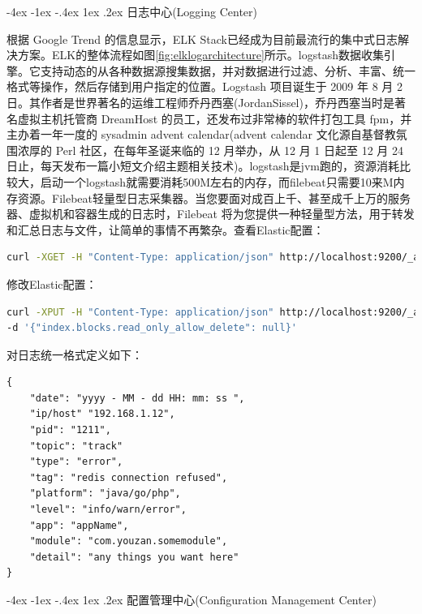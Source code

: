 \documentclass[8pt]{book}
\makeatletter
\numberwithin{dummy}{section}
\theoremstyle{ocrenumbox}
\theoremstyle{blacknumex}
\theoremstyle{blacknumbox}
\theoremstyle{ocrenum}
\renewcommand{\section}{\@startsection{section}{1}{\z@}
	{-4ex \@plus -1ex \@minus -.4ex}
	{1ex \@plus.2ex }
	{\normalfont\large\sffamily\bfseries}}
\makeatother
\begin{document}
\section{日志中心(Logging Center)}

根据 Google Trend 的信息显示，ELK Stack已经成为目前最流行的集中式日志解决方案。ELK的整体流程如图\ref{fig:elklogarchitecture}所示。logstash数据收集引擎。它支持动态的从各种数据源搜集数据，并对数据进行过滤、分析、丰富、统一格式等操作，然后存储到用户指定的位置。Logstash 项目诞生于 2009 年 8 月 2 日。其作者是世界著名的运维工程师乔丹西塞(JordanSissel)，乔丹西塞当时是著名虚拟主机托管商 DreamHost 的员工，还发布过非常棒的软件打包工具 fpm，并主办着一年一度的 sysadmin advent calendar(advent calendar 文化源自基督教氛围浓厚的 Perl 社区，在每年圣诞来临的 12 月举办，从 12 月 1 日起至 12 月 24 日止，每天发布一篇小短文介绍主题相关技术)。logstash是jvm跑的，资源消耗比较大，启动一个logstash就需要消耗500M左右的内存，而filebeat只需要10来M内存资源。Filebeat轻量型日志采集器。当您要面对成百上千、甚至成千上万的服务器、虚拟机和容器生成的日志时，Filebeat 将为您提供一种轻量型方法，用于转发和汇总日志与文件，让简单的事情不再繁杂。查看Elastic配置：

\begin{lstlisting}[language=Bash]
curl -XGET -H "Content-Type: application/json" http://localhost:9200/_all/_settings|jq '.'
\end{lstlisting}

修改Elastic配置：

\begin{lstlisting}[language=Bash]
curl -XPUT -H "Content-Type: application/json" http://localhost:9200/_all/_settings 
-d '{"index.blocks.read_only_allow_delete": null}'
\end{lstlisting}

对日志统一格式定义如下：


\begin{lstlisting}
{
	"date": "yyyy - MM - dd HH: mm: ss ",
	"ip/host" "192.168.1.12",
	"pid": "1211",
	"topic": "track"
	"type": "error",
	"tag": "redis connection refused",
	"platform": "java/go/php",
	"level": "info/warn/error",
	"app": "appName",
	"module": "com.youzan.somemodule",
	"detail": "any things you want here"
}
\end{lstlisting}

\section{配置管理中心(Configuration Management Center)}
\end{document}
